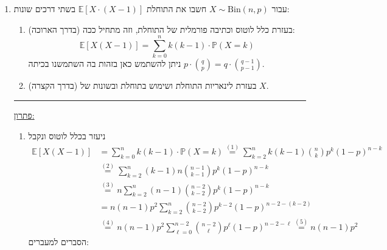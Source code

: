 \documentclass[12pt, a4paper]{article}
\newcommand{\PP}{\mathbb{P}}
\newcommand{\Bin}{\mathrm{Bin}}
\newcommand{\Ber}{\mathrm{Ber}}
\newcommand{\EE}{\mathbb{E}}
\begin{document}
\begin{enumerate}
\underline{פתרון:}
\begin{enumerate}
\item
נסמן ב-$X$
את מספר הקורסים הכלליים בהם לא יהיה שום סטודנט מהמחלקה לאומנות יפנית עתיקה, ונרצה לחשב את התוחלת של
$X$.
בשביל זה נגדיר כעת
$100$
משתנים מקריים חדשים כך:
$$X_k=
\begin{cases}
1&\text{אם בקורס ה-$k$ אין סטודנט מהמחלקה לאומנות יפנית עתיקה}
\\
0&\text{בכל מקרה אחר}\\
\end{cases} $$
לכל
$k=1,2,\ldots,100$.
נשים לב כי טווח הערכים שלו הוא
$\{0,1\}$,
לכן
$X_k\sim \Ber(p_k)$,
כאשר
$$p_k=\PP(\text{אם בקורס ה-$k$ אין סטודנט מהמחלקה לאומנות יפנית עתיקה})=
\left(\frac{99}{100}\right)^{20}=0.818$$
כי זה בעצם אומר שכל סטודנט, מבין ה-$20$, יכול לבחור כל קורס אחר פרט לקורס ה-$k$.
מהגדרת המשתנים המקריים, מתקיים
$$X=X_1+\ldots+X_{100}$$
ולכן מלינאריות התוחלת
$$.\EE[X]=\EE[X_1]+\ldots+\EE[X_{100}]=100\cdot 0.818=81.8$$

\noindent\rule{15cm}{0.4pt}

\item
נשים לב כי 
מספר הקורסים הכלליים בהם יהיה לפחות סטודנט אחד מהמחלקה לאומנות יפנית עתיקה שווה
$100-X$,
ולכן מלינאריות התוחלת ומסעיף א׳:
$$.\EE[100-X]
=100-\EE[X]=18.2$$
\end{enumerate}
\newpage
\item
עבור
$X\sim \Bin(n,p)$
חשבו את התוחלת
$\EE[X\cdot(X-1)]$
 בשתי דרכים שונות:
 \begin{enumerate}
 \item
 (בדרך הארוכה) בעזרת כלל לוטוס וכתיבה פורמלית של התוחלת, וזה מתחיל ככה:
 $$\EE[X(X-1)]
 =\sum_{k=0}^n
 k(k-1)
 \cdot
 \PP(X=k)$$
 ניתן להשתמש כאן בזהות בה השתמשנו בכיתה
 $p\cdot
 \binom{q}{p}
 =q\cdot \binom{q-1}{p-1}$.
 \item
 (בדרך הקצרה) בעזרת לינאריות התוחלת ושימוש בתוחלת ובשונות של
 $X$.
 \end{enumerate}

\noindent\rule{15cm}{0.4pt}

\underline{פתרון:}
\begin{enumerate}
\item
ניעזר בכלל לוטוס ונקבל
\begin{align*}
\EE[X(X-1)]
 &=\sum_{k=0}^n
 k(k-1)
 \cdot
 \PP(X=k)
 \overset{(1)}{=}\sum_{k=2}^n
 k(k-1)
 \binom{n}{k}
 p^k(1-p)^{n-k}
 \\&\overset{(2)}{=}
 \sum_{k=2}^n
 (k-1)n
 \binom{n-1}{k-1}
 p^k(1-p)^{n-k}
 \\&\overset{(3)}{=}n\sum_{k=2}^n 
(n-1) \binom{n-2}{k-2}
p^k(1-p)^{n-k}
\\&= n(n-1)p^2\sum_{k=2}^n
\binom{n-2}{k-2}
p^{k-2}(1-p)^{n-2-(k-2)}
\\&\overset{(4)}{=}
n(n-1)p^2\sum_{\ell=0}^{n-2}
\binom{n-2}{\ell}p^{\ell}(1-p)^{n-2-\ell}
\overset{(5)}{=}n(n-1)p^2
\end{align*}
הסברים למעברים:


\end{enumerate}
\end{enumerate}
\end{document}
